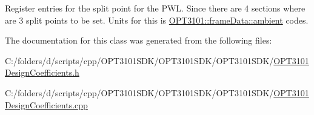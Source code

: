 Register entries for the split point for the P\+WL. Since there are 4 sections where are 3 split points to be set. Units for this is \mbox{\hyperlink{class_o_p_t3101_1_1frame_data_a39ebf8bd06141bef6986e49013d03c35}{O\+P\+T3101\+::frame\+Data\+::ambient}} codes. 



The documentation for this class was generated from the following files\+:\begin{DoxyCompactItemize}
\item 
C\+:/folders/d/scripts/cpp/\+O\+P\+T3101\+S\+D\+K/\+O\+P\+T3101\+S\+D\+K/\+O\+P\+T3101\+S\+D\+K/\mbox{\hyperlink{_o_p_t3101_design_coefficients_8h}{O\+P\+T3101\+Design\+Coefficients.\+h}}\item 
C\+:/folders/d/scripts/cpp/\+O\+P\+T3101\+S\+D\+K/\+O\+P\+T3101\+S\+D\+K/\+O\+P\+T3101\+S\+D\+K/\mbox{\hyperlink{_o_p_t3101_design_coefficients_8cpp}{O\+P\+T3101\+Design\+Coefficients.\+cpp}}\end{DoxyCompactItemize}
